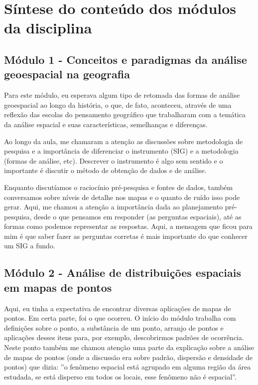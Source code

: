 \section{Síntese do conteúdo dos módulos da disciplina}

\subsection{Módulo 1 - Conceitos e paradigmas da análise geoespacial na geografia}

Para este módulo, eu esperava algum tipo de retomada das formas de análise geoespacial ao longo da história, o que, de fato, aconteceu, através de uma reflexão das escolas do pensamento geográfico que trabalharam com a temática da análise espacial e suas características, semelhanças e diferenças. 

Ao longo da aula, me chamaram a atenção as discussões sobre metodologia de pesquisa e a importância de diferenciar o instrumento (SIG) e a metodologia (formas de análise, etc). Descrever o instrumento é algo sem sentido e o importante é discutir o método de obtenção de dados e de análise. 

Enquanto discutíamos o raciocínio pré-pesquisa e fontes de dados, também conversamos sobre níveis de detalhe nos mapas e o quanto de ruído isso pode gerar. Aqui, me chamou a atenção a importância dada ao planejamento pré-pesquisa, desde o que pensamos em responder (as perguntas espaciais), até as formas como podemos representar as respostas. Aqui, a mensagem que ficou para mim é que saber fazer as perguntas corretas é mais importante do que conhecer um SIG a fundo.



\subsection{Módulo 2 - Análise de distribuições espaciais em mapas de pontos}

Aqui, eu tinha a expectativa de encontrar diversas aplicações de mapas de pontos. Em certa parte, foi o que ocorreu. O início do módulo trabalha com definições sobre o ponto, a substância de um ponto, arranjo de pontos e aplicações desses itens para, por exemplo, descobrirmos padrões de ocorrência. Neste ponto também me chamou atenção uma parte da explicação sobre a análise de mapas de pontos (onde a discussão era sobre padrão, dispersão e densidade de pontos) que dizia: ''o fenômeno espacial está agrupado em alguma região da área estudada, se está disperso em todos os locais, esse fenômeno não é espacial''.

